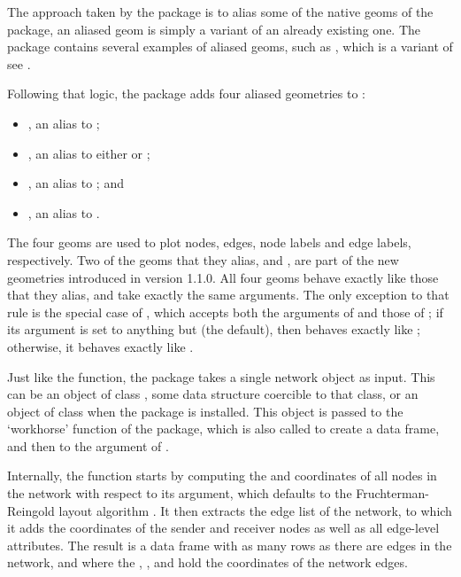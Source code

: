 The approach taken by the  package is to alias some of the native geoms of the  package, an aliased geom is simply a variant of an already existing one. The  package contains several examples of aliased geoms, such as , which is a variant of  see \citep[see][p.~67, Table~4.6]{ggplot2}.

Following that logic, the  package adds four aliased geometries to :

\begin{itemize}
  \item {}, an alias to ;
  \item {}, an alias to either  or ;
  \item {}, an alias to ; and
  \item {}, an alias to .
\end{itemize}

The four geoms are used to plot nodes, edges, node labels and edge labels, respectively. Two of the geoms that they alias,  and , are part of the new geometries introduced in  version 1.1.0. All four geoms behave exactly like those that they alias, and take exactly the same arguments. The only exception to that rule is the special case of , which accepts both the arguments of  and those of ; if its  argument is set to anything but  (the default), then  behaves exactly like ; otherwise, it behaves exactly like .

Just like the  function, the  package takes a single network object as input. This can be an object of class , some data structure coercible to that class, or an object of class  when the  package is installed. This object is passed to the `workhorse' function of the package, which is also called  to create a data frame, and then to the  argument of .

Internally, the  function starts by computing the  and  coordinates of all nodes in the network with respect to its  argument, which defaults to the Fruchterman-Reingold layout algorithm \citep{fruchterman_reingold}. It then extracts the edge list of the network, to which it adds the coordinates of the sender and receiver nodes as well as all edge-level attributes. The result is a data frame with as many rows as there are edges in the network, and where the , ,  and  hold the coordinates of the network edges.

